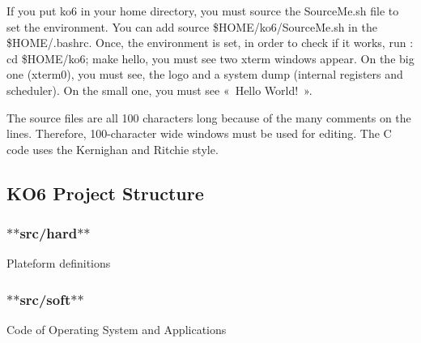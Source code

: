If you put ko6 in your home directory, you must source the {\ttfamily Source\-Me.\-sh} file to set the environment. You can add {\ttfamily source \$\-H\-O\-M\-E/ko6/\-Source\-Me.sh} in the {\ttfamily \$\-H\-O\-M\-E/.bashrc}. Once, the environment is set, in order to check if it works, run \-: {\ttfamily cd \$\-H\-O\-M\-E/ko6; make hello}, you must see two xterm windows appear. On the big one (xterm0), you must see, the logo and a system dump (internal registers and scheduler). On the small one, you must see « \-Hello World! ».

The source files are all 100 characters long because of the many comments on the lines. Therefore, 100-\/character wide windows must be used for editing. The C code uses the Kernighan and Ritchie style.

\subsection*{K\-O6 Project Structure}

\subsubsection*{$\ast$$\ast$src/hard$\ast$$\ast$}

Plateform definitions

\subsubsection*{$\ast$$\ast$src/soft$\ast$$\ast$}

Code of Operating System and Applications


